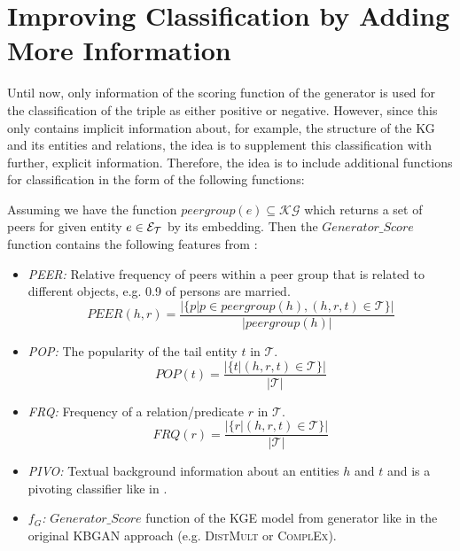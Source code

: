 \section{Improving Classification by Adding More Information} 
\label{sec:feature_functions}

Until now, only information of the scoring function of the generator is used for the classification of the triple as either positive or negative.
However, since this only contains implicit information about, for example, the structure of the \ac{KG} and its entities and relations, the idea is to supplement this classification with further, explicit information.
Therefore, the idea is to include additional functions for classification in the form of the following functions: 

Assuming we have the function $peergroup(e) \subseteq \mathcal{KG}$ which returns a set of peers for given entity $e \in \mathcal{E}_{\mathcal{T}}$ by its embedding. 
Then the $Generator\_Score$ function contains the following features from \cite{arnaout2020enriching}:
\begin{itemize}
    \item 
    \emph{\ac{PEER}:} 
    Relative frequency of peers within a peer group that is related to different objects, e.g. 0.9 of persons are married. 
    \begin{equation}
        PEER(h,r) = \frac{|\{p | p \in peergroup(h), (h, r, t) \in \mathcal{T}\}|}{|peergroup(h)|}
    \end{equation}

    \item
    \emph{\ac{POP}:} 
    The popularity of the tail entity $t$ in $\mathcal{T}$. 
    \begin{equation}
        POP(t) = \frac{|\{t | (h, r , t) \in \mathcal{T}\}|}{|\mathcal{T}|}
    \end{equation}

    \item 
    \emph{\ac{FRQ}:} 
    Frequency of a relation/predicate $r$ in $\mathcal{T}$. 
    \begin{equation}
        FRQ(r) = \frac{|\{r | (h, r, t) \in \mathcal{T}\}|}{|\mathcal{T}|}
    \end{equation}
    
    \item 
    \emph{\ac{PIVO}:} 
    Textual background information about an entities $h$ and $t$ and is a pivoting classifier like in \cite{arnaout2020enriching}.
    
    \item 
    \emph{$f_G$:} 
    $Generator\_Score$ function of the \ac{KGE} model from generator like in the original \ac{KBGAN} approach (e.g. \textsc{DistMult}  or \textsc{ComplEx}).
\end{itemize}



